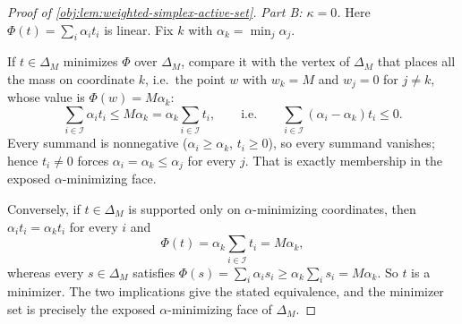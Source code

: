 \begin{proof}[Proof of \cref{obj:lem:weighted-simplex-active-set}]
\emph{Part B: \(\kappa=0\).}  Here \(\Phi(t)=\sum_i\alpha_it_i\) is linear.  Fix \(k\) with \(\alpha_k=\min_j\alpha_j\).

If \(t\in\Delta_M\) minimizes \(\Phi\) over \(\Delta_M\), compare it with the vertex of \(\Delta_M\) that places all the mass on coordinate \(k\), i.e.\ the point \(w\) with \(w_k=M\) and \(w_j=0\) for \(j\ne k\), whose value is \(\Phi(w)=M\alpha_k\):
\[
\sum_{i\in\mathcal I}\alpha_it_i\le M\alpha_k=\alpha_k\sum_{i\in\mathcal I}t_i,
\qquad\text{i.e.}\qquad
\sum_{i\in\mathcal I}(\alpha_i-\alpha_k)t_i\le0 .
\]
Every summand is nonnegative (\(\alpha_i\ge\alpha_k\), \(t_i\ge0\)), so every summand vanishes; hence \(t_i\ne0\) forces \(\alpha_i=\alpha_k\le\alpha_j\) for every \(j\).  That is exactly membership in the exposed \(\alpha\)-minimizing face.

Conversely, if \(t\in\Delta_M\) is supported only on \(\alpha\)-minimizing coordinates, then \(\alpha_it_i=\alpha_kt_i\) for every \(i\) and
\[
\Phi(t)=\alpha_k\sum_{i\in\mathcal I}t_i=M\alpha_k ,
\]
whereas every \(s\in\Delta_M\) satisfies \(\Phi(s)=\sum_i\alpha_is_i\ge\alpha_k\sum_is_i=M\alpha_k\).  So \(t\) is a minimizer.  The two implications give the stated equivalence, and the minimizer set is precisely the exposed \(\alpha\)-minimizing face of \(\Delta_M\). %
\end{proof}
